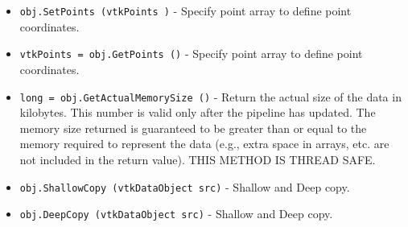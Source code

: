 \begin{itemize}
\item  \verb|obj.SetPoints (vtkPoints )| -  Specify point array to define point coordinates.

\item  \verb|vtkPoints = obj.GetPoints ()| -  Specify point array to define point coordinates.

\item  \verb|long = obj.GetActualMemorySize ()| -  Return the actual size of the data in kilobytes. This number
 is valid only after the pipeline has updated. The memory size
 returned is guaranteed to be greater than or equal to the
 memory required to represent the data (e.g., extra space in
 arrays, etc. are not included in the return value). THIS METHOD
 IS THREAD SAFE.

\item  \verb|obj.ShallowCopy (vtkDataObject src)| -  Shallow and Deep copy.

\item  \verb|obj.DeepCopy (vtkDataObject src)| -  Shallow and Deep copy.

\end{itemize}
